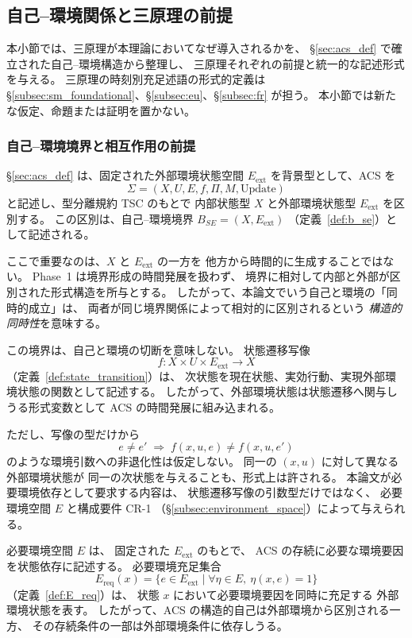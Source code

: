 \subsection{自己--環境関係と三原理の前提}
\label{subsec:self_env_principles}

本小節では、三原理が本理論においてなぜ導入されるかを、
\S\ref{sec:acs_def} で確立された自己--環境構造から整理し、
三原理それぞれの前提と統一的な記述形式を与える。
三原理の時刻別充足述語の形式的定義は
\S\ref{subsec:sm_foundational}、\S\ref{subsec:eu}、\S\ref{subsec:fr} が担う。
本小節では新たな仮定、命題または証明を置かない。

\subsubsection{自己--環境境界と相互作用の前提}

\S\ref{sec:acs_def} は、固定された外部環境状態空間
$E_{\mathrm{ext}}$ を背景型として、ACS を
\[
  \Sigma=(X,U,E,f,\Pi,M,\mathrm{Update})
\]
と記述し、型分離規約 TSC のもとで
内部状態型 $X$ と外部環境状態型 $E_{\mathrm{ext}}$ を区別する。
この区別は、自己--環境境界
$B_{SE}=(X,E_{\mathrm{ext}})$
（定義~\ref{def:b_se}）として記述される。

ここで重要なのは、$X$ と $E_{\mathrm{ext}}$ の一方を
他方から時間的に生成することではない。
Phase~1 は境界形成の時間発展を扱わず、
境界に相対して内部と外部が区別された形式構造を所与とする。
したがって、本論文でいう自己と環境の「同時的成立」は、
両者が同じ境界関係によって相対的に区別されるという
\emph{構造的同時性}を意味する。

この境界は、自己と環境の切断を意味しない。
状態遷移写像
\[
  f:X\times U\times E_{\mathrm{ext}}\to X
\]
（定義~\ref{def:state_transition}）は、
次状態を現在状態、実効行動、実現外部環境状態の関数として記述する。
したがって、外部環境状態は状態遷移へ関与しうる形式変数として
ACS の時間発展に組み込まれる。

ただし、写像の型だけから
\[
  e\neq e'
  \;\Longrightarrow\;
  f(x,u,e)\neq f(x,u,e')
\]
のような環境引数への非退化性は仮定しない。
同一の $(x,u)$ に対して異なる外部環境状態が
同一の次状態を与えることも、形式上は許される。
本論文が必要環境依存として要求する内容は、
状態遷移写像の引数型だけではなく、
必要環境空間 $E$ と構成要件 CR-1
（\S\ref{subsec:environment_space}）によって与えられる。

必要環境空間 $E$ は、
固定された $E_{\mathrm{ext}}$ のもとで、
ACS の存続に必要な環境要因を状態依存に記述する。
必要環境充足集合
\[
  E_{\mathrm{req}}(x)
  =
  \{e\in E_{\mathrm{ext}}\mid
    \forall\eta\in E,\ \eta(x,e)=1\}
\]
（定義~\ref{def:E_req}）は、
状態 $x$ において必要環境要因を同時に充足する
外部環境状態を表す。
したがって、ACS の構造的自己は外部環境から区別される一方、
その存続条件の一部は外部環境条件に依存しうる。

